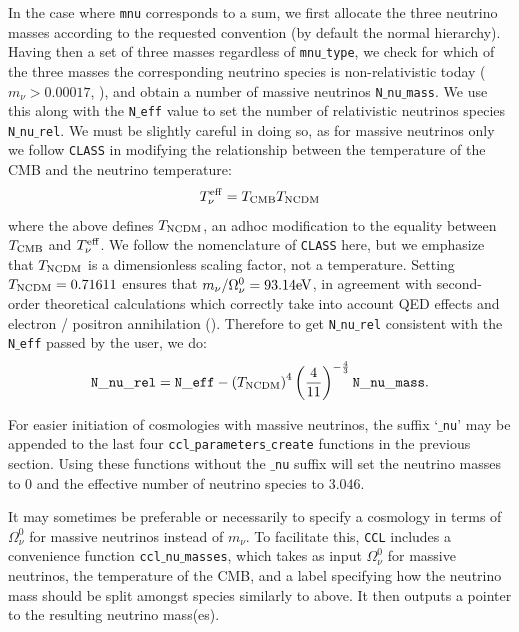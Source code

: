 \documentclass[\docopts]{\docclass}
\newcommand{\ccl}{{\tt CCL}\xspace}
\begin{document}
In the case where {\tt mnu} corresponds to a sum, we first allocate the three neutrino masses according to the requested convention (by default the normal hierarchy). Having then a set of three masses regardless of {\tt mnu$\_$type}, we check for which of the three masses the corresponding neutrino species is non-relativistic today ($m_\nu>0.00017$, \citealt{Lesgourgues2012}), and obtain a number of massive neutrinos {\tt N$\_$nu$\_$mass}. We use this along with the {\tt N$\_$eff} value to set the number of relativistic neutrinos species {\tt N$\_$nu$\_$rel}. We must be slightly careful in doing so, as for massive neutrinos only we follow {\tt CLASS} in modifying the relationship between the temperature of the CMB and the neutrino temperature:
\begin{equation}
T_{\nu}^{\rm eff} = T_{\rm CMB} T_{\rm NCDM}
\label{Tnueff}
\end{equation}
where the above defines $T_{\rm NCDM}$, an adhoc modification to the equality between $T_{\rm CMB}$ and $T_{\nu}^{\rm eff}$. We follow the nomenclature of {\tt CLASS} here, but we emphasize that $T_{\rm NCDM}$ is a dimensionless scaling factor, not a temperature. Setting $T_{\rm NCDM}=0.71611$ ensures that $m_{\nu} / \Omega_{\nu}^0 = 93.14 {\rm eV}$, in agreement with second-order theoretical calculations which correctly take into account QED effects and electron / positron annihilation (\citealt{Mangano2005}). Therefore to get {\tt N$\_$nu$\_$rel} consistent with the {\tt N$\_$eff} passed by the user, we do:
\begin{equation}
{\tt N\_nu\_rel} = {\tt N\_eff} - \left(T_{\rm NCDM}\right)^{4} \left(\frac{4}{11}\right)^{-\frac{4}{3}} {\tt N\_nu\_mass}.
\label{Nnurel}
\end{equation}

For easier initiation of cosmologies with massive neutrinos, the suffix `{\tt $\_$nu}' may be appended to the last four {\tt ccl$\_$parameters$\_$create} functions in the previous section. Using these functions without the {\tt $\_$nu} suffix will set the neutrino masses to 0 and the effective number of neutrino species to $3.046$. 

It may sometimes be preferable or necessarily to specify a cosmology in terms of $\Omega_\nu^0$ for massive neutrinos instead of $m_\nu$. To facilitate this, \ccl includes a convenience function {\tt ccl$\_$nu$\_$masses}, which takes as input $\Omega_\nu^0$ for massive neutrinos, the temperature of the CMB, and a label specifying how the neutrino mass should be split amongst species similarly to above. It then outputs a pointer to the resulting neutrino mass(es). 
\end{document}
